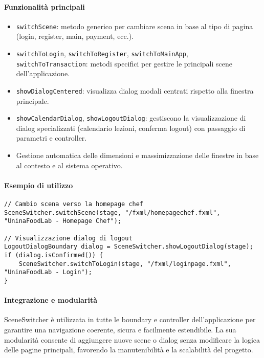 \paragraph{Funzionalità principali}
\begin{itemize}
    \item \texttt{switchScene}: metodo generico per cambiare scena in base al tipo di pagina (login, register, main, payment, ecc.).
    \item \texttt{switchToLogin}, \texttt{switchToRegister}, \texttt{switchToMainApp}, \texttt{switchToTransaction}: metodi specifici per gestire le principali scene dell'applicazione.
    \item \texttt{showDialogCentered}: visualizza dialog modali centrati rispetto alla finestra principale.
    \item \texttt{showCalendarDialog}, \texttt{showLogoutDialog}: gestiscono la visualizzazione di dialog specializzati (calendario lezioni, conferma logout) con passaggio di parametri e controller.
    \item Gestione automatica delle dimensioni e massimizzazione delle finestre in base al contesto e al sistema operativo.
\end{itemize}

\paragraph{Esempio di utilizzo}
\begin{verbatim}
// Cambio scena verso la homepage chef
SceneSwitcher.switchScene(stage, "/fxml/homepagechef.fxml", "UninaFoodLab - Homepage Chef");

// Visualizzazione dialog di logout
LogoutDialogBoundary dialog = SceneSwitcher.showLogoutDialog(stage);
if (dialog.isConfirmed()) {
    SceneSwitcher.switchToLogin(stage, "/fxml/loginpage.fxml", "UninaFoodLab - Login");
}
\end{verbatim}

\paragraph{Integrazione e modularità}
SceneSwitcher è utilizzata in tutte le boundary e controller dell'applicazione per garantire una navigazione coerente, sicura e facilmente estendibile. La sua modularità consente di aggiungere nuove scene o dialog senza modificare la logica delle pagine principali, favorendo la manutenibilità e la scalabilità del progetto.

